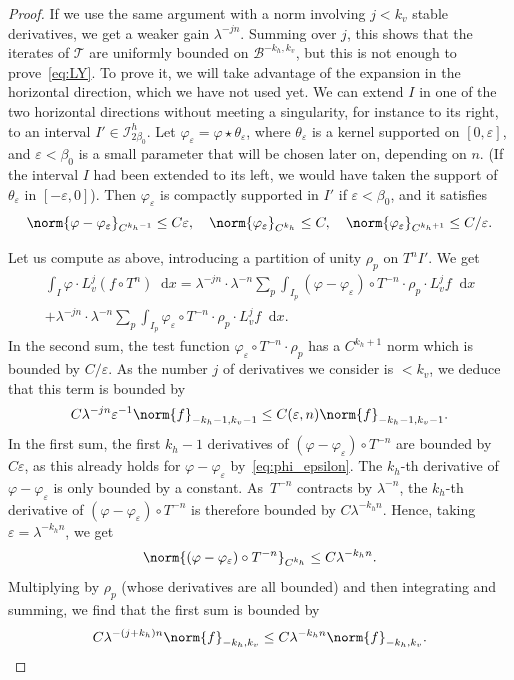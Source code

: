 \documentclass[JEP,XML,SOM,Unicode]{cedram}
\newcommand{\boI}{\mathcal{I}}
\newcommand{\boB}{\mathcal{B}}
\newcommand{\boT}{\mathcal{T}}
\newcommand{\dd}{\mathop{}\!\mathrm{d}}
\let\epsilon\varepsilon
\let\phi\varphi
\theoremstyle{definition}
\numberwithin{equation}{section}
\begin{document}
\begin{proof}
If we use the same argument with a norm involving $j < k_v$ stable
derivatives, we get a weaker gain $\lambda^{-jn}$. Summing over $j$, this
shows that the iterates of $\boT$ are uniformly bounded on $\boB^{-k_h,
k_v}$, but this is not enough to prove~\eqref{eq:LY}. To prove it, we will
take advantage of the expansion in the horizontal direction, which we have
not used yet. We can extend $I$ in one of the two horizontal directions
without meeting a singularity, for instance to its right, to an interval $I'
\in \boI^h_{2\beta_0}$. Let $\phi_\epsilon = \phi \star \theta_\epsilon$, where $\theta_\epsilon$ is a kernel supported on $[0,\epsilon]$, and
$\epsilon<\beta_0$ is a small parameter that will be chosen later on,
depending on $n$. (If the interval $I$ had been extended to its left, we
would have taken the support of $\theta_\epsilon$ in $[-\epsilon, 0]$). Then
$\phi_\epsilon$ is compactly supported in $I'$ if $\epsilon<\beta_0$, and it
satisfies
\begin{equation}
\label{eq:phi_epsilon}
\norm{\phi-\phi_\epsilon}_{C^{k_h-1}} \leq C \epsilon,\quad
\norm{\phi_\epsilon}_{C^{k_h}} \leq C, \quad
\norm{\phi_\epsilon}_{C^{k_h+1}} \leq C/\epsilon.
\end{equation}

Let us compute as above, introducing a partition of unity $\rho_p$ on $T^n
I'$. We get
\begin{multline*}
\int_I \phi \cdot L_v^j(f \circ T^n) \dd x
= \lambda^{-jn} \cdot \lambda^{-n} \sum_p \int_{I_p} (\phi-\phi_\epsilon) \circ T^{-n} \cdot \rho_p \cdot L_v^j f \dd x
\\[-5pt] + \lambda^{-jn} \cdot \lambda^{-n} \sum_p \int_{I_p} \phi_\epsilon \circ T^{-n} \cdot \rho_p \cdot L_v^j f \dd x.
\end{multline*}
In the second sum, the test function $\phi_\epsilon \circ T^{-n} \cdot
\rho_p$ has a $C^{k_h+1}$ norm which is bounded by $C/\epsilon$. As the
number $j$ of derivatives we consider is $<k_v$, we deduce that this term is
bounded by
\[
C \lambda^{-jn} \epsilon^{-1} \norm{f}_{-k_h-1, k_v-1} \leq
C(\epsilon, n) \norm{f}_{-k_h-1, k_v-1}.
\]
In the first sum, the first $k_h-1$
derivatives of $(\phi-\phi_\epsilon) \circ T^{-n}$ are bounded by
$C\epsilon$, as this already holds for $\phi-\phi_\epsilon$
by~\eqref{eq:phi_epsilon}. The $k_h$-th derivative of $\phi-\phi_\epsilon$ is
only bounded by a constant. As~$T^{-n}$ contracts by $\lambda^{-n}$, the
$k_h$-th derivative of $(\phi-\phi_\epsilon) \circ T^{-n}$ is therefore
bounded by $C \lambda^{-k_h n}$. Hence, taking $\epsilon = \lambda^{-k_h n}$,
we get
\[
\norm{(\phi-\phi_\epsilon) \circ T^{-n}}_{C^{k_h}} \leq C
\lambda^{-k_h n}.
\]
Multiplying by $\rho_p$ (whose derivatives are all
bounded) and then integrating and summing, we find that the first sum is
bounded by
\[
C \lambda^{-(j+k_h)n} \norm{f}_{-k_h, k_v} \leq C \lambda^{-k_h
n} \norm{f}_{-k_h, k_v}.
\]


\end{proof}
\end{document}
